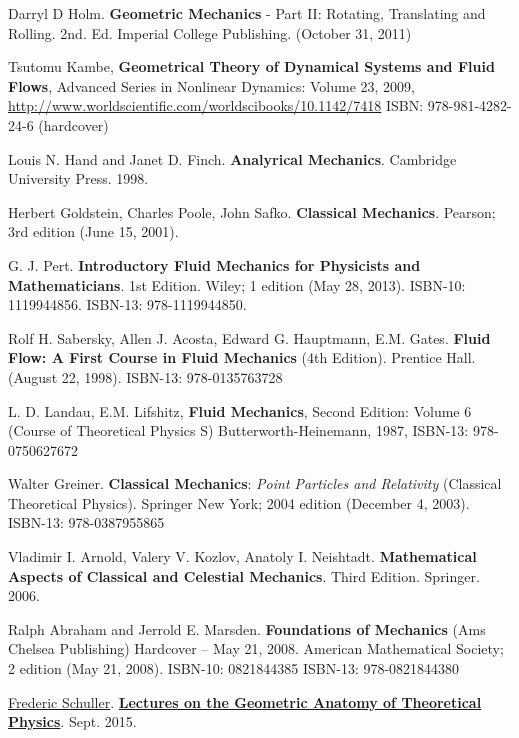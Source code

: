 \documentclass[10pt]{amsart}
\begin{document}
\begin{thebibliography}{9}
Darryl D Holm. \textbf{Geometric Mechanics} - Part II: Rotating, Translating and Rolling. 2nd. Ed. Imperial College Publishing. (October 31, 2011) 

Tsutomu Kambe, \textbf{Geometrical Theory of Dynamical Systems and Fluid Flows}, Advanced Series in Nonlinear Dynamics: Volume 23, 2009, \url{http://www.worldscientific.com/worldscibooks/10.1142/7418} ISBN: 978-981-4282-24-6 (hardcover)

Louis N. Hand and Janet D. Finch. \textbf{Analyrical Mechanics}. Cambridge University Press. 1998. 

Herbert Goldstein, Charles Poole, John Safko. \textbf{Classical Mechanics}. Pearson; 3rd edition (June 15, 2001).

G. J. Pert. \textbf{Introductory Fluid Mechanics for Physicists and Mathematicians}. 1st Edition. Wiley; 1 edition (May 28, 2013). ISBN-10: 1119944856. ISBN-13: 978-1119944850. 

Rolf H. Sabersky, Allen J. Acosta, Edward G. Hauptmann, E.M. Gates.  \textbf{Fluid Flow: A First Course in Fluid Mechanics} (4th Edition).  Prentice Hall. (August 22, 1998).  ISBN-13: 978-0135763728

L. D. Landau, E.M. Lifshitz, \textbf{Fluid Mechanics}, Second Edition: Volume 6 (Course of Theoretical Physics S) Butterworth-Heinemann, 1987, ISBN-13: 978-0750627672


Walter Greiner. \textbf{Classical Mechanics}: \emph{Point Particles and Relativity} (Classical Theoretical Physics). Springer New York; 2004 edition (December 4, 2003). ISBN-13: 978-0387955865

Vladimir I. Arnold, Valery V. Kozlov, Anatoly I. Neishtadt.  \textbf{Mathematical Aspects of Classical and Celestial Mechanics}.  Third Edition.  Springer. 2006.  

Ralph Abraham and Jerrold E. Marsden. 
\textbf{Foundations of Mechanics} (Ams Chelsea Publishing) Hardcover – May 21, 2008.  American Mathematical Society; 2 edition (May 21, 2008). ISBN-10: 0821844385
ISBN-13: 978-0821844380

\href{https://www.youtube.com/c/FredericSchuller}{Frederic Schuller}. \href{https://youtube.com/playlist?list=PLPH7f_7ZlzxTi6kS4vCmv4ZKm9u8g5yic}{\textbf{Lectures on the Geometric Anatomy of Theoretical Physics}}. Sept. 2015.


\end{thebibliography}
\end{document}

